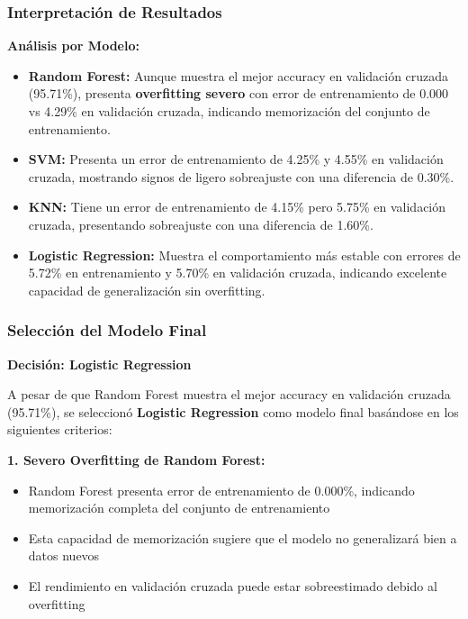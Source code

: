 \documentclass{article}
\begin{document}
\subsubsection{Interpretación de Resultados}

\textbf{Análisis por Modelo:}

\begin{itemize}
    \item \textbf{Random Forest:} Aunque muestra el mejor accuracy en validación cruzada (95.71\%), presenta \textbf{overfitting severo} con error de entrenamiento de 0.000 vs 4.29\% en validación cruzada, indicando memorización del conjunto de entrenamiento.
    
    \item \textbf{SVM:} Presenta un error de entrenamiento de 4.25\% y 4.55\% en validación cruzada, mostrando signos de ligero sobreajuste con una diferencia de 0.30\%.
    
    \item \textbf{KNN:} Tiene un error de entrenamiento de 4.15\% pero 5.75\% en validación cruzada, presentando sobreajuste con una diferencia de 1.60\%.
    
    \item \textbf{Logistic Regression:} Muestra el comportamiento más estable con errores de 5.72\% en entrenamiento y 5.70\% en validación cruzada, indicando excelente capacidad de generalización sin overfitting.
\end{itemize}

\subsubsection{Selección del Modelo Final}

\textbf{Decisión: Logistic Regression}

A pesar de que Random Forest muestra el mejor accuracy en validación cruzada (95.71\%), se seleccionó \textbf{Logistic Regression} como modelo final basándose en los siguientes criterios:

\textbf{1. Severo Overfitting de Random Forest:}
\begin{itemize}
    \item Random Forest presenta error de entrenamiento de 0.000\%, indicando memorización completa del conjunto de entrenamiento
    \item Esta capacidad de memorización sugiere que el modelo no generalizará bien a datos nuevos
    \item El rendimiento en validación cruzada puede estar sobreestimado debido al overfitting
\end{itemize}
\end{document}
